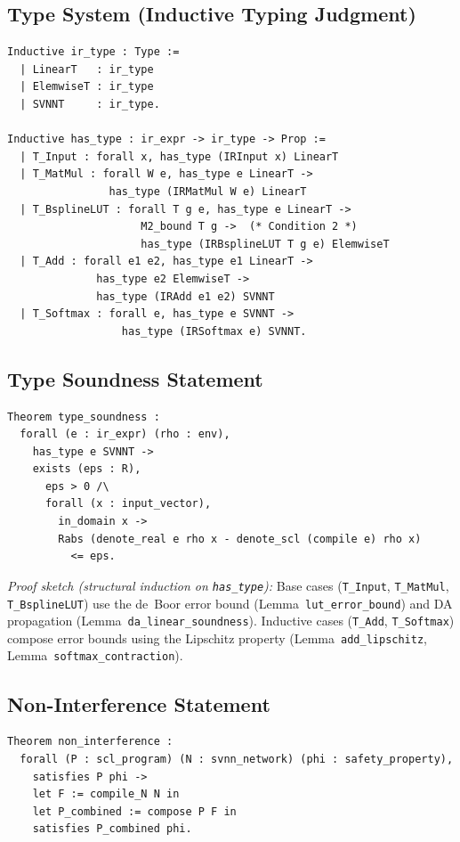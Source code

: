 \subsection{Type System (Inductive Typing Judgment)}

\begin{verbatim}
Inductive ir_type : Type :=
  | LinearT   : ir_type
  | ElemwiseT : ir_type
  | SVNNT     : ir_type.

Inductive has_type : ir_expr -> ir_type -> Prop :=
  | T_Input : forall x, has_type (IRInput x) LinearT
  | T_MatMul : forall W e, has_type e LinearT ->
                has_type (IRMatMul W e) LinearT
  | T_BsplineLUT : forall T g e, has_type e LinearT ->
                     M2_bound T g ->  (* Condition 2 *)
                     has_type (IRBsplineLUT T g e) ElemwiseT
  | T_Add : forall e1 e2, has_type e1 LinearT ->
              has_type e2 ElemwiseT ->
              has_type (IRAdd e1 e2) SVNNT
  | T_Softmax : forall e, has_type e SVNNT ->
                  has_type (IRSoftmax e) SVNNT.
\end{verbatim}

\subsection{Type Soundness Statement}

\begin{verbatim}
Theorem type_soundness :
  forall (e : ir_expr) (rho : env),
    has_type e SVNNT ->
    exists (eps : R),
      eps > 0 /\
      forall (x : input_vector),
        in_domain x ->
        Rabs (denote_real e rho x - denote_scl (compile e) rho x)
          <= eps.
\end{verbatim}

\textit{Proof sketch (structural induction on \texttt{has\_type}):}
Base cases (\texttt{T\_Input}, \texttt{T\_MatMul}, \texttt{T\_BsplineLUT})
use the de~Boor error bound (Lemma~\texttt{lut\_error\_bound}) and DA
propagation (Lemma~\texttt{da\_linear\_soundness}). Inductive cases
(\texttt{T\_Add}, \texttt{T\_Softmax}) compose error bounds using the
Lipschitz property (Lemma~\texttt{add\_lipschitz},
Lemma~\texttt{softmax\_\allowbreak{}contraction}).

\subsection{Non-Interference Statement}

\begin{verbatim}
Theorem non_interference :
  forall (P : scl_program) (N : svnn_network) (phi : safety_property),
    satisfies P phi ->
    let F := compile_N N in
    let P_combined := compose P F in
    satisfies P_combined phi.
\end{verbatim}

